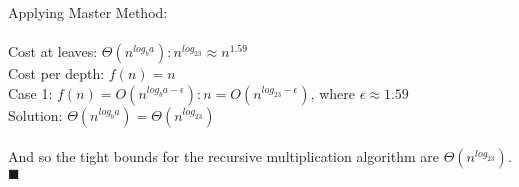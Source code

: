 \documentclass[a4paper]{article}
\begin{document}
Applying Master Method:  \\ \\
Cost at leaves: $\Theta(n^{log_ba}): n^{log_23} \approx n^{1.59}$ \\
Cost per depth: $f(n) = n$ \\
Case 1: $f(n) = O(n^{log_ba-\epsilon}): n = O(n^{log_23-\epsilon})$, where $\epsilon \approx 1.59$\\
Solution: $\Theta(n^{log_ba}) = \Theta(n^{log_23})$ \\ \\
And so the tight bounds for the recursive multiplication algorithm are $\Theta(n^{log_23})$. \\
$\blacksquare$ \\ \\
\end{document}
